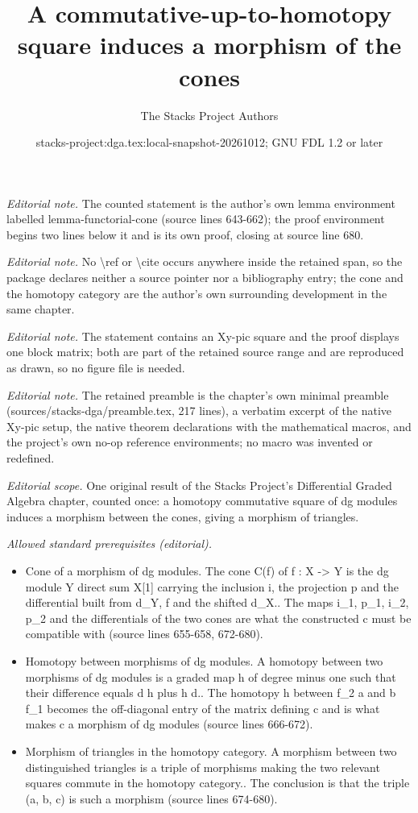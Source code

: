 \documentclass{stacks-project}
\title{A commutative-up-to-homotopy square induces a morphism of the cones}
\author{The Stacks Project Authors}
\date{stacks-project:dga.tex:local-snapshot-20261012; GNU FDL 1.2 or later}
\theoremstyle{plain}
\theoremstyle{definition}
\theoremstyle{remark}
\numberwithin{equation}{subsection}
\begin{document}
\maketitle
\noindent\textit{Editorial note.} The counted statement is the author's own lemma environment labelled lemma-functorial-cone (source lines 643-662); the proof environment begins two lines below it and is its own proof, closing at source line 680.\par\medskip
\noindent\textit{Editorial note.} No \textbackslash{}ref or \textbackslash{}cite occurs anywhere inside the retained span, so the package declares neither a source pointer nor a bibliography entry; the cone and the homotopy category are the author's own surrounding development in the same chapter.\par\medskip
\noindent\textit{Editorial note.} The statement contains an Xy-pic square and the proof displays one block matrix; both are part of the retained source range and are reproduced as drawn, so no figure file is needed.\par\medskip
\noindent\textit{Editorial note.} The retained preamble is the chapter's own minimal preamble (sources/stacks-dga/preamble.tex, 217 lines), a verbatim excerpt of the native Xy-pic setup, the native theorem declarations with the mathematical macros, and the project's own no-op reference environments; no macro was invented or redefined.\par\medskip
\noindent\textit{Editorial scope.} One original result of the Stacks Project's Differential Graded Algebra chapter, counted once: a homotopy commutative square of dg modules induces a morphism between the cones, giving a morphism of triangles.\par\medskip
\noindent\textit{Allowed standard prerequisites (editorial).}\begin{itemize}
\item Cone of a morphism of dg modules. The cone C(f) of f : X -> Y is the dg module Y direct sum X[1] carrying the inclusion i, the projection p and the differential built from d\_Y, f and the shifted d\_X.. The maps i\_1, p\_1, i\_2, p\_2 and the differentials of the two cones are what the constructed c must be compatible with (source lines 655-658, 672-680).
\item Homotopy between morphisms of dg modules. A homotopy between two morphisms of dg modules is a graded map h of degree minus one such that their difference equals d h plus h d.. The homotopy h between f\_2 a and b f\_1 becomes the off-diagonal entry of the matrix defining c and is what makes c a morphism of dg modules (source lines 666-672).
\item Morphism of triangles in the homotopy category. A morphism between two distinguished triangles is a triple of morphisms making the two relevant squares commute in the homotopy category.. The conclusion is that the triple (a, b, c) is such a morphism (source lines 674-680).
\end{itemize}\medskip
\end{document}
